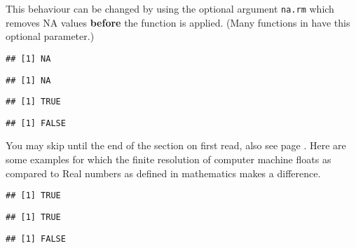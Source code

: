 \documentclass[paper=a4,headsepline,BCOR=12mm,twoside,open=right,%
titlepage,headings=small,fontsize=10pt,index=totoc,bibliography=totoc,%
captions=tableheading,captions=nooneline]{scrbook}\usepackage{knitr}
\begin{document}
This behaviour can be changed by using the optional argument \texttt{na.rm} which removes NA values \textbf{before} the function is applied. (Many functions in \R have this optional parameter.)

\begin{knitrout}\footnotesize
{}\color{fgcolor}\begin{kframe}
\begin{alltt}
 \hlopt{<} \hlstd{)}
\end{alltt}
\begin{verbatim}
## [1] NA
\end{verbatim}
\begin{alltt}
 \hlopt{>} \hlstd{)}
\end{alltt}
\begin{verbatim}
## [1] NA
\end{verbatim}
\begin{alltt}
 \hlopt{<} \hlstd{,} \hlstd{=}\hlstd{)}
\end{alltt}
\begin{verbatim}
## [1] TRUE
\end{verbatim}
\begin{alltt}
 \hlopt{>} \hlstd{,} \hlstd{=}\hlstd{)}
\end{alltt}
\begin{verbatim}
## [1] FALSE
\end{verbatim}
\end{kframe}
\end{knitrout}

You may skip until the end of the section on first read, also see page \pageref{par:float}. Here are some examples for which the finite resolution of computer machine floats as compared to Real numbers as defined in mathematics makes a difference.

\begin{knitrout}\footnotesize
{}\color{fgcolor}\begin{kframe}
\begin{alltt}
 \hlopt{==}  \hlopt{+} 
\end{alltt}
\begin{verbatim}
## [1] TRUE
\end{verbatim}
\begin{alltt}
 \hlopt{==}  \hlopt{+} 
\end{alltt}
\begin{verbatim}
## [1] TRUE
\end{verbatim}
\begin{alltt}
 \hlopt{==} 
\end{alltt}
\begin{verbatim}
## [1] FALSE
\end{verbatim}
\end{kframe}
\end{knitrout}
\end{document}
